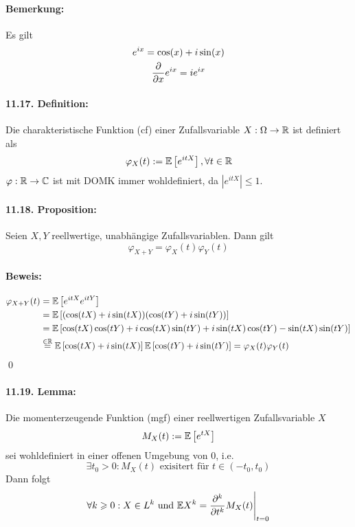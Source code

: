 \paragraph{Bemerkung:} Es gilt
\begin{gather*}
    e^{ix}=\cos(x)+i\sin(x) \\
    \dfrac{\partial}{\partial x}e^{ix}=ie^{ix}
\end{gather*}
 
\paragraph{11.17. Definition:} Die charakteristische Funktion (cf) einer Zufallsvariable $X:\Omega\to\mathbb{R}$ ist definiert als
$$\varphi_X(t):=\mathbb{E} \left[e^{itX}\right],\forall t\in\mathbb{R}$$
$\varphi:\mathbb{R}\to\mathbb{C}$ ist mit DOMK immer wohldefiniert, da $\left|e^{itX}\right|\leq1$.

\paragraph{11.18. Proposition:} Seien $X,Y$ reellwertige, unabh\"angige Zufallsvariablen. Dann gilt
$$\varphi_{X+Y}=\varphi_X(t)\varphi_Y(t)$$

\paragraph{Beweis:}
\begin{align*}
    \varphi_{X+Y}(t)&=\mathbb{E}\left[e^{itX}e^{itY}\right] \\
    &=\mathbb{E}\left[(\cos(tX)+i\sin(tX))(\cos(tY)+i\sin(tY))\right] \\
    &=\mathbb{E}\left[\cos(tX)\cos(tY)+i\cos(tX)\sin(tY)+i\sin(tX)\cos(tY)-\sin(tX)\sin(tY)\right] \\
    &\overset{\in\mathbb{R}}{=}\mathbb{E}\left[\cos(tX)+i\sin(tX)\right]\mathbb{E}\left[\cos(tY)+i\sin(tY)\right]=\varphi_X(t)\varphi_Y(t)
\end{align*}\qed

\paragraph{11.19. Lemma:} Die momenterzeugende Funktion (mgf) einer reellwertigen Zufallsvariable $X$
$$M_X(t):=\mathbb{E}\left[e^{tX}\right]$$
sei wohldefiniert in einer offenen Umgebung von $0$, i.e. 
$$\exists t_0>0:M_X(t)\text{ exisitert f\"ur } t\in(-t_0,t_0)$$
Dann folgt
$$\forall k\geqslant0:X\in L^k \text{ und }\mathbb{E} X^k=\dfrac{\partial^k}{\partial t^k}M_X(t)\Bigg|_{t=0}$$

